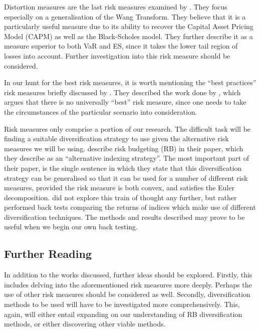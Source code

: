 \documentclass[12pt,a4paper]{article}
\begin{document}
Distortion measures are the last risk measures examined by \cite{dowd2006after}. They focus especially on a generalisation of the Wang Transform. They believe that it is a particularly useful measure due to its ability to recover the Capital Asset Pricing Model (CAPM) as well as the Black-Scholes model. They further describe it as a measure superior to both VaR and ES, since it takes the lower tail region of losses into account. Further investigation into this risk measure should be considered.

In our hunt for the best risk measures, it is worth mentioning the ``best practices'' risk measures briefly discussed by \cite{dowd2006after}. They described the work done by \cite{dhaene2003economic}, which argues that there is no universally “best” risk measure, since one needs to take the circumstances of the particular scenario into consideration.

Risk measures only comprise a portion of our research. The difficult task will be finding a suitable diversification strategy to use given the alternative risk measures we will be using. \cite{bruder2012managing} describe risk budgeting (RB) in their paper, which they describe as an ``alternative indexing strategy''. The most important part of their paper, is the single sentence in which they state that this diversification strategy can be generalised so that it can be used for a number of different risk measures, provided the risk measure is both convex, and satisfies the Euler decomposition. \cite{bruder2012managing} did not explore this train of thought any further, but rather performed back tests comparing the returns of indices which make use of different diversification techniques. The methods and results described may prove to be useful when we begin our own back testing. 


\subsection{Further Reading}
\label{subsec:FurRead}

In addition to the works discussed, further ideas should be explored. Firstly, this includes delving into the aforementioned risk measures more deeply. Perhaps the use of other risk measures should be considered as well. Secondly, diversification methods to be used will have to be investigated more comprehensively. This, again, will either entail expanding on our understanding of RB diversification methods, or either discovering other viable methods. 
\end{document}
